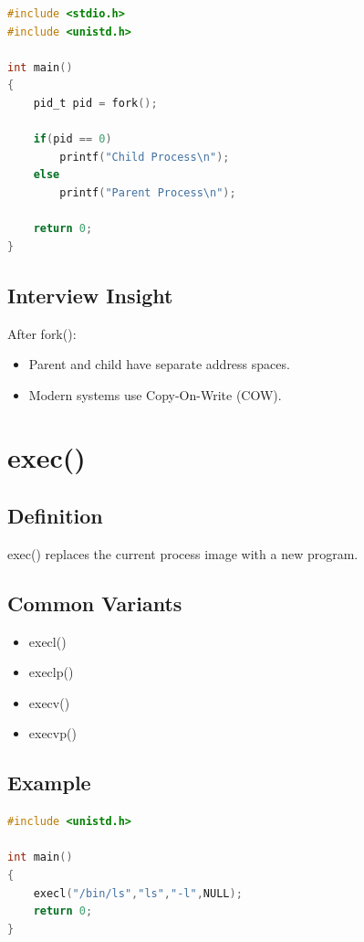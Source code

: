\begin{lstlisting}[language=C]
#include <stdio.h>
#include <unistd.h>

int main()
{
    pid_t pid = fork();

    if(pid == 0)
        printf("Child Process\n");
    else
        printf("Parent Process\n");

    return 0;
}
\end{lstlisting}

\subsection{Interview Insight}

After fork():

\begin{itemize}
\item Parent and child have separate address spaces.
\item Modern systems use Copy-On-Write (COW).
\end{itemize}

\section{exec()}

\subsection{Definition}

exec() replaces the current process image with a new program.

\subsection{Common Variants}

\begin{itemize}
\item execl()
\item execlp()
\item execv()
\item execvp()
\end{itemize}

\subsection{Example}

\begin{lstlisting}[language=C]
#include <unistd.h>

int main()
{
    execl("/bin/ls","ls","-l",NULL);
    return 0;
}
\end{lstlisting}

